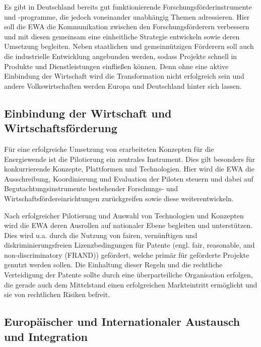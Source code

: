 Es gibt in Deutschland bereits gut funktionierende Forschungsförderinstrumente und -programme, die jedoch voneinander unabhängig Themen adressieren.
Hier soll die EWA die Kommunikation zwischen den Forschungsförderern verbessern und mit diesen gemeinsam eine einheitliche Strategie entwickeln sowie deren Umsetzung begleiten.
Neben staatlichen und gemeinnützigen Förderern soll auch die industrielle Entwicklung angebunden werden, sodass Projekte schnell in Produkte und Dienstleistungen einfließen können.
Denn ohne eine aktive Einbindung der Wirtschaft wird die Transformation nicht erfolgreich sein und andere Volkswirtschaften werden Europa und Deutschland hinter sich lassen.

\subsection{Einbindung der Wirtschaft und Wirtschaftsförderung}

Für eine erfolgreiche Umsetzung von erarbeiteten Konzepten für die Energiewende ist die Pilotierung ein zentrales Instrument.
Dies gilt besonders für konkurrierende Konzepte, Plattformen und Technologien.
Hier wird die EWA die Ausschreibung, Koordinierung und Evaluation der Piloten steuern und dabei auf Begutachtungsinstrumente bestehender Forschungs- und Wirtschaftsfördereinrichtungen zurückgreifen sowie diese weiterentwickeln.

Nach erfolgreicher Pilotierung und Auswahl von Technologien und Konzepten wird die EWA deren Ausrollen auf nationaler Ebene begleiten und unterstützen.
Dies wird u.a. durch die Nutzung von fairen, vernünftigen und diskriminierungsfreien Lizenzbedingungen für Patente (engl. fair, reasonable, and non-discriminatory (FRAND)) gefördert, welche primär für geförderte Projekte genutzt werden sollen.
Die Einhaltung dieser Regeln und die rechtliche Verteidigung der Patente sollte durch eine überparteiliche Organisation erfolgen, die gerade auch dem Mittelstand einen erfolgreichen Markteintritt ermöglicht und sie von rechtlichen Risiken befreit.


\subsection{Europäischer und Internationaler Austausch und Integration}

